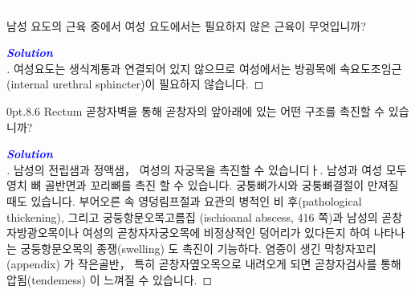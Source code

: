 \documentclass[10pt]{amsart}
\makeatletter
\numberwithin{theorem}{section}
\numberwithin{example}{section}
\newenvironment{prob}[1]
  {\renewcommand\theinnercustompro{#1}\innercustompro}
  {\endinnercustompro}
\newenvironment{solution}
  {\begin{proof}[\textbf{\textcolor{blue}{Solution}}\\]}
  {\end{proof}}
\theoremstyle{definition}
\theoremstyle{remark}
\renewcommand\section{\@startsection{section}{1}%
{0pt}{.8\linespacing\@plus\linespacing}{.6\linespacing}%
{\LARGE\bfseries\color{black}}}
\makeatother
\begin{document}
\textcolor{white}{124} \\

\begin{prob}{2}
\textnormal{
남성 요도의 근육 중에서 여성 요도에서는 필요하지 않은 근육이 무엇입니까?}
\end{prob}
\begin{solution}
 여성요도는 
생식계통과 연결되어 있지 않으므로 여성에서는 방굉목에 속요도조임근 
(internal urethral sphincter)이 필요하지 않습니다.

\end{solution}
\section{Rectum}
\begin{prob}{3}
\textnormal{곧창자벽을 통해 곧창자의 앞아래에 있는 어떤  구조를 촉진할 수 있습니까?}
\end{prob}
\begin{solution}
남성의 전립샘과 정액샘， 여성의 자궁목을 촉진할 수 있습니디ㅏ. 남성과 여성 모두 영치 뼈 골반면과 꼬리뼈를 촉진 할 수 있습니다.  궁퉁뼈가시와 궁퉁뼈결절이 만져질 때도 있습니다. 부어오른 속 
영덩림프절과 요관의 병적인 비 후(pathological thickening), 그리고 궁둥항문오목고름집 (ischioanal abscess, 416 쪽)과 남성의 곧창자방광오목이나 여성의 곧창자자궁오목에 비정상적인 덩어리가 있다든지 하여 나타나는 궁둥항문오목의 종쟁(swelling) 도 촉진이 기능하다. 염증이 생긴 막창자꼬리 (appendix) 가 작은골반， 특히 곧창자옆오목으로 내려오게  되면 곧창자검사를 통해 압됨(tendemess) 이 느껴질 수 있습니다.

\end{solution}
\end{document}
